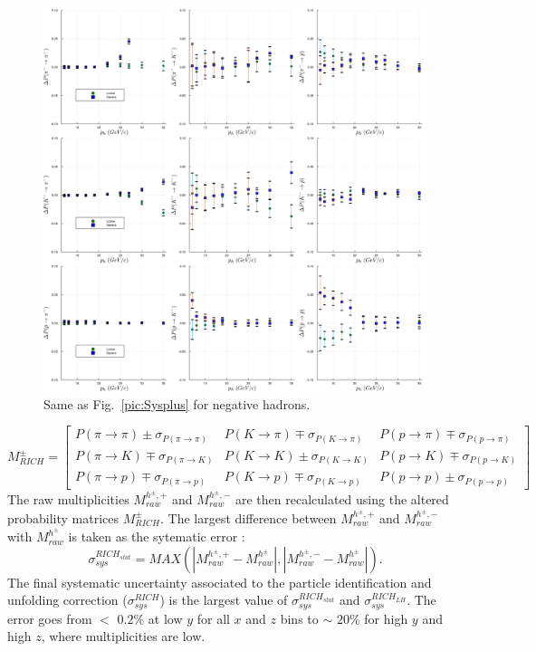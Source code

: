 \begin{figure}[!p]
	\centering
	\includegraphics[scale=0.1]{./gfx/SysMinus.png}
	\caption{Same as Fig.~\ref{pic:Sysplus} for negative hadrons.}
	\label{pic:Sysminus}
\end{figure}
%
\begin{equation}
  M^{\pm}_{RICH}
  =
  \begin{bmatrix}
  P(\pi \rightarrow \pi)\pm\sigma_{P(\pi \rightarrow \pi)} & P(K \rightarrow \pi)\mp\sigma_{P(K \rightarrow \pi)} & P(p \rightarrow \pi)\mp\sigma_{P(p \rightarrow \pi)}\\
  P(\pi \rightarrow K)\mp\sigma_{P(\pi \rightarrow K)} & P(K \rightarrow K)\pm\sigma_{P(K \rightarrow K)} & P(p \rightarrow K)\mp\sigma_{P(p \rightarrow K)} \\
  P(\pi \rightarrow p)\mp\sigma_{P(\pi \rightarrow p)} & P(K \rightarrow p)\mp\sigma_{P(K \rightarrow p)} & P(p \rightarrow p)\pm\sigma_{P(p \rightarrow p)}
  \end{bmatrix}
	\label{eq:StatMat}
\end{equation}
%
The raw multiplicities $M^{h^{\pm},+}_{raw}$ and $M^{h^{\pm},-}_{raw}$ are then recalculated using the altered probability matrices $M^{\pm}_{RICH}$. The largest difference between
$M^{h^{\pm},+}_{raw}$ and $M^{h^{\pm},-}_{raw}$ with $M^{h^{\pm}}_{raw}$ is taken as the sytematic error :
%
\begin{equation}
  \sigma^{RICH_{stat}}_{sys} = MAX(|M^{h^{\pm},+}_{raw}-M^{h^{\pm}}_{raw}|,|M^{h^{\pm},-}_{raw}-M^{h^{\pm}}_{raw}|).
\end{equation}
%
The final systematic uncertainty associated to the particle identification and unfolding correction ($\sigma^{RICH}_{sys}$) is the largest value of $\sigma^{RICH_{stat}}_{sys}$ and $\sigma^{RICH_{LH}}_{sys}$. The error goes from $<$ $0.2$\% at low $y$ for all $x$ and $z$ bins to $\sim$ $20$\% for high $y$ and high $z$, where multiplicities are low.

